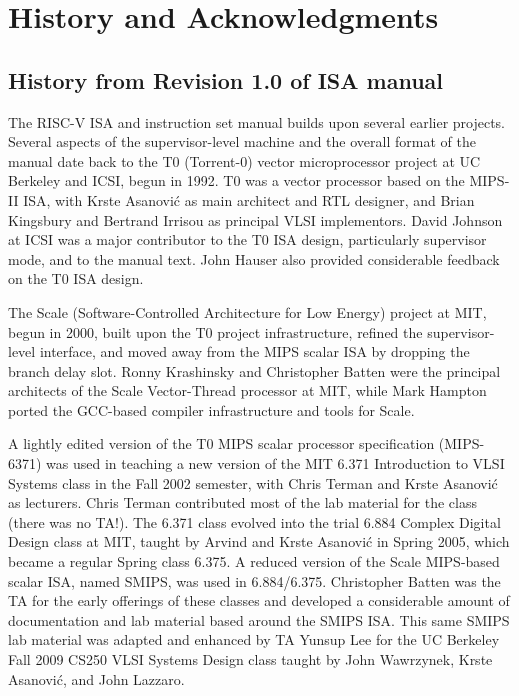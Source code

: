 \chapter{History and Acknowledgments}
\label{history}

\section{History from Revision 1.0 of ISA manual}

The RISC-V ISA and instruction set manual builds upon several earlier
projects.  Several aspects of the supervisor-level machine and the
overall format of the manual date back to the T0 (Torrent-0) vector
microprocessor project at UC Berkeley and ICSI, begun in 1992.  T0 was
a vector processor based on the MIPS-II ISA, with Krste Asanovi\'{c}
as main architect and RTL designer, and Brian Kingsbury and Bertrand
Irrisou as principal VLSI implementors.  David Johnson at ICSI was a
major contributor to the T0 ISA design, particularly supervisor mode,
and to the manual text.  John Hauser also provided considerable
feedback on the T0 ISA design.

The Scale (Software-Controlled Architecture for Low Energy) project at
MIT, begun in 2000, built upon the T0 project infrastructure, refined
the supervisor-level interface, and moved away from the MIPS scalar
ISA by dropping the branch delay slot.  Ronny Krashinsky and
Christopher Batten were the principal architects of the Scale
Vector-Thread processor at MIT, while Mark Hampton ported the
GCC-based compiler infrastructure and tools for Scale.

A lightly edited version of the T0 MIPS scalar processor specification
(MIPS-6371) was used in teaching a new version of the MIT 6.371
Introduction to VLSI Systems class in the Fall 2002 semester, with
Chris Terman and Krste Asanovi\'{c} as lecturers.  Chris Terman
contributed most of the lab material for the class (there was no
TA!). The 6.371 class evolved into the trial 6.884 Complex Digital
Design class at MIT, taught by Arvind and Krste Asanovi\'{c} in Spring
2005, which became a regular Spring class 6.375.  A reduced version of
the Scale MIPS-based scalar ISA, named SMIPS, was used in 6.884/6.375.
Christopher Batten was the TA for the early offerings of these classes
and developed a considerable amount of documentation and lab material
based around the SMIPS ISA.  This same SMIPS lab material was adapted
and enhanced by TA Yunsup Lee for the UC Berkeley Fall 2009 CS250 VLSI
Systems Design class taught by John Wawrzynek, Krste Asanovi\'{c}, and
John Lazzaro.


